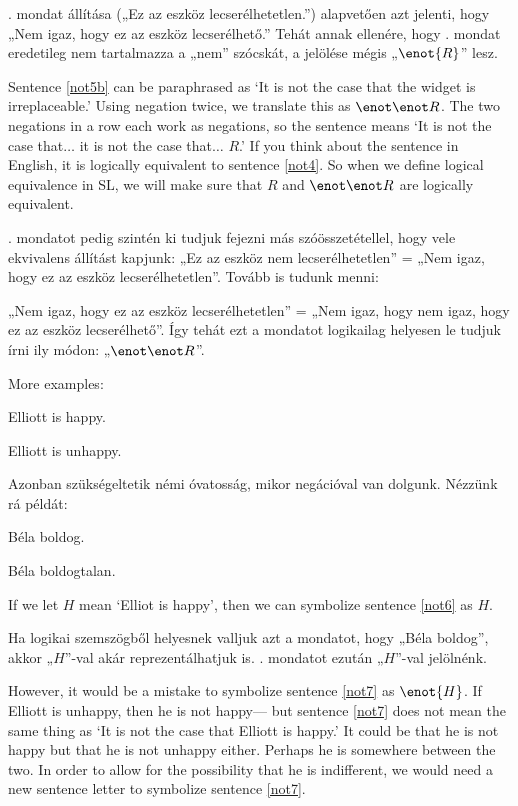 . mondat állítása („Ez az eszköz lecserélhetetlen.”) alapvetően azt jelenti, hogy „Nem igaz, hogy ez az eszköz lecserélhető.” Tehát annak ellenére, hogy . mondat eredetileg nem tartalmazza a „nem” szócskát, a jelölése mégis „$\enot{R}$” lesz.

Sentence \ref{not5b} can be paraphrased as `It is not the case that the widget is irreplaceable.' Using negation twice, we translate this as $\enot\enot R$. The two negations in a row each work as negations, so the sentence means `It is not the case that$\ldots$ it is not the case that$\ldots$ $R$.' If you think about the sentence in English, it is logically equivalent to sentence \ref{not4}. So when we define logical equivalence in SL, we will make sure that $R$ and $\enot\enot R$ are logically equivalent.

. mondatot pedig szintén ki tudjuk fejezni más szóösszetétellel, hogy vele ekvivalens állítást kapjunk: „Ez az eszköz nem lecserélhetetlen” = „Nem igaz, hogy ez az eszköz lecserélhetetlen”.
Tovább is tudunk menni:

„Nem igaz, hogy ez az eszköz lecserélhetetlen” = „Nem igaz, hogy nem igaz, hogy ez az eszköz lecserélhető”.  Így tehát ezt a mondatot logikailag helyesen le tudjuk írni ily módon: „$\enot\enot R$”.

More examples:
\begin{earg}
\item[\ex{not6}] Elliott is happy.
\item[\ex{not7}] Elliott is unhappy.
\end{earg}

Azonban szükségeltetik némi óvatosság, mikor negációval van dolgunk. Nézzünk rá példát:
\begin{earg}
\item[\ex{not6}] Béla boldog.
\item[\ex{not7}] Béla boldogtalan.
\end{earg}


If we let $H$ mean `Elliot is happy', then we can symbolize sentence \ref{not6} as $H$.

Ha logikai szemszögből helyesnek valljuk azt a mondatot, hogy „Béla boldog”, akkor „$H$”-val akár reprezentálhatjuk is.
. mondatot ezután „$H$”-val jelölnénk.

However, it would be a mistake to symbolize sentence \ref{not7} as $\enot{H}$. If Elliott is unhappy, then he is not happy--- but sentence \ref{not7} does not mean the same thing as `It is not the case that Elliott is happy.' It could be that he is not happy but that he is not unhappy either. Perhaps he is somewhere between the two. In order to allow for the possibility that he is indifferent, we would need a new sentence letter to symbolize sentence \ref{not7}.

